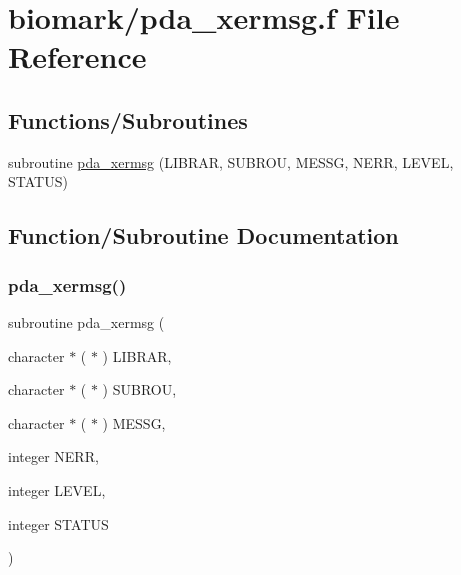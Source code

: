 \hypertarget{pda__xermsg_8f}{}\section{biomark/pda\+\_\+xermsg.f File Reference}
\label{pda__xermsg_8f}
\subsection*{Functions/\+Subroutines}
\begin{DoxyCompactItemize}
\item 
subroutine \hyperlink{pda__xermsg_8f_ae749b6fabddedb01def2addd84d94c32}{pda\+\_\+xermsg} (L\+I\+B\+R\+AR, S\+U\+B\+R\+OU, M\+E\+S\+SG, N\+E\+RR, L\+E\+V\+EL, S\+T\+A\+T\+US)
\end{DoxyCompactItemize}


\subsection{Function/\+Subroutine Documentation}
\mbox{\label{pda__xermsg_8f_ae749b6fabddedb01def2addd84d94c32}} 
\subsubsection{\texorpdfstring{pda\+\_\+xermsg()}{pda\_xermsg()}}
{\footnotesize\ttfamily subroutine pda\+\_\+xermsg (\begin{DoxyParamCaption}\item[{character $\ast$ ( $\ast$ )}]{L\+I\+B\+R\+AR,  }\item[{character $\ast$ ( $\ast$ )}]{S\+U\+B\+R\+OU,  }\item[{character $\ast$ ( $\ast$ )}]{M\+E\+S\+SG,  }\item[{integer}]{N\+E\+RR,  }\item[{integer}]{L\+E\+V\+EL,  }\item[{integer}]{S\+T\+A\+T\+US }\end{DoxyParamCaption})}


